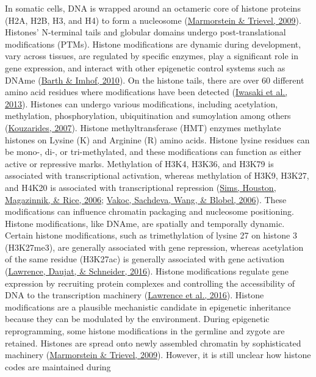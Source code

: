\documentclass[12pt,twoside]{reedthesis}
\begin{document}
In somatic cells, DNA is wrapped around an octameric core of histone
proteins (H2A, H2B, H3, and H4) to form a nucleosome (\protect\hyperlink{ref-marmorstein2009}{Marmorstein \& Trievel, 2009}).
Histones' N-terminal tails and globular domains undergo
post-translational modifications (PTMs). Histone modifications are
dynamic during development, vary across tissues, are regulated by
specific enzymes, play a significant role in gene expression, and
interact with other epigenetic control systems such as DNAme
(\protect\hyperlink{ref-barth2010}{Barth \& Imhof, 2010}). On the histone tails, there are over 60 different amino
acid residues where modifications have been detected (\protect\hyperlink{ref-iwasaki2013}{Iwasaki et al., 2013}).
Histones can undergo various modifications, including acetylation,
methylation, phosphorylation, ubiquitination and sumoylation among
others (\protect\hyperlink{ref-kouzarides2007}{Kouzarides, 2007}). Histone methyltransferase (HMT) enzymes
methylate histones on Lysine (K) and Arginine (R) amino acids. Histone
lysine residues can be mono-, di-, or tri-methylated, and these
modifications can function as either active or repressive marks.
Methylation of H3K4, H3K36, and H3K79 is associated with transcriptional
activation, whereas methylation of H3K9, H3K27, and H4K20 is associated
with transcriptional repression (\protect\hyperlink{ref-sims2006}{Sims, Houston, Magazinnik, \& Rice, 2006}; \protect\hyperlink{ref-vakoc2006}{Vakoc, Sachdeva, Wang, \& Blobel, 2006}). These
modifications can influence chromatin packaging and nucleosome
positioning. Histone modifications, like DNAme, are spatially and
temporally dynamic. Certain histone modifications, such as
trimethylation of lysine 27 on histone 3 (H3K27me3), are generally
associated with gene repression, whereas acetylation of the same residue
(H3K27ac) is generally associated with gene activation (\protect\hyperlink{ref-lawrence2016}{Lawrence, Daujat, \& Schneider, 2016}).
Histone modifications regulate gene expression by recruiting protein
complexes and controlling the accessibility of DNA to the transcription
machinery (\protect\hyperlink{ref-lawrence2016}{Lawrence et al., 2016}). Histone modifications are a plausible
mechanistic candidate in epigenetic inheritance because they can be modulated by the
environment. During epigenetic reprogramming, some histone modifications
in the germline and zygote are retained. Histones are spread onto newly
assembled chromatin by sophisticated machinery (\protect\hyperlink{ref-marmorstein2009}{Marmorstein \& Trievel, 2009}).
However, it is still unclear how histone codes are maintained during
\end{document}
